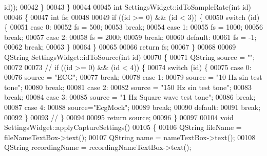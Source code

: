 \begin{DoxyCode}
{      id}));
00042     \}
00043 \}
00044 
00045 \textcolor{keywordtype}{int} SettingsWidget::idToSampleRate(\textcolor{keywordtype}{int} \textcolor{keywordtype}{id})
00046 \{
00047     \textcolor{keywordtype}{int} fs;
00048 
00049     \textcolor{keywordflow}{if} ((\textcolor{keywordtype}{id} >= 0) && (\textcolor{keywordtype}{id} < 3)) \{
00050         \textcolor{keywordflow}{switch} (\textcolor{keywordtype}{id}) \{
00051         \textcolor{keywordflow}{case} 0:
00052             fs = 500;
00053             \textcolor{keywordflow}{break};
00054         \textcolor{keywordflow}{case} 1:
00055             fs = 1000;
00056             \textcolor{keywordflow}{break};
00057         \textcolor{keywordflow}{case} 2:
00058             fs = 2000;
00059             \textcolor{keywordflow}{break};
00060         \textcolor{keywordflow}{default}:
00061             fs = -1;
00062             \textcolor{keywordflow}{break};
00063         \}
00064     \}
00065 
00066     \textcolor{keywordflow}{return} fs;
00067 \}
00068 
00069 QString SettingsWidget::idToSource(\textcolor{keywordtype}{int} \textcolor{keywordtype}{id})
00070 \{
00071     QString source = \textcolor{stringliteral}{""};
00072 
00073  \textcolor{comment}{//   if ((id >= 0) && (id < 4)) \{}
00074         \textcolor{keywordflow}{switch} (\textcolor{keywordtype}{id}) \{
00075         \textcolor{keywordflow}{case} 0:
00076             source = \textcolor{stringliteral}{"ECG"};
00077             \textcolor{keywordflow}{break};
00078         \textcolor{keywordflow}{case} 1:
00079             source = \textcolor{stringliteral}{"10 Hz sin test tone"};
00080             \textcolor{keywordflow}{break};
00081         \textcolor{keywordflow}{case} 2:
00082             source = \textcolor{stringliteral}{"150 Hz sin test tone"};
00083             \textcolor{keywordflow}{break};
00084         \textcolor{keywordflow}{case} 3:
00085             source = \textcolor{stringliteral}{"1 Hz Square wave test tone"};
00086             \textcolor{keywordflow}{break};
00087         \textcolor{keywordflow}{case} 4:
00088             source=\textcolor{stringliteral}{"EcgMock"};
00089             \textcolor{keywordflow}{break};
00090         \textcolor{keywordflow}{default}:
00091             \textcolor{keywordflow}{break};
00092         \}
00093  \textcolor{comment}{//   \}}
00094 
00095     \textcolor{keywordflow}{return} source;
00096 \}
00097 
00104 \textcolor{keywordtype}{void} SettingsWidget::applyCaptureSettings()
00105 \{
00106     QString fileName = fileNameTextBox->text();
00107     QString name = nameTextBox->text();
00108     QString recordingName = recordingNameTextBox->text();

\end{DoxyCode}
